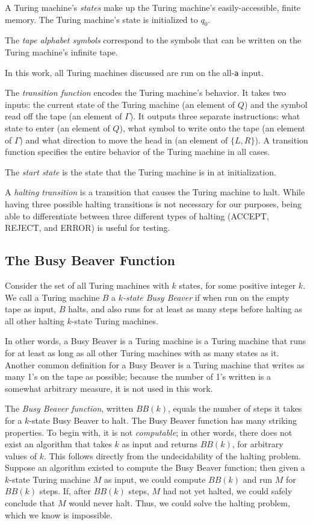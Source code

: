 \documentclass[11pt]{article}
\begin{document}
A Turing machine's \emph{states} make up the Turing machine's easily-accessible, finite memory. The Turing machine's state is initialized to $q_0$. 

The \emph{tape alphabet symbols} correspond to the symbols that can be written on the Turing machine's infinite tape. 

In this work, all Turing machines discussed are run on the all-\texttt{a} input. 

The \emph{transition function} encodes the Turing machine's behavior. It takes two inputs: the current state of the Turing machine (an element of $Q$) and the symbol read off the tape (an element of $\Gamma$). It outputs three separate instructions: what state to enter (an element of $Q$), what symbol to write onto the tape (an element of $\Gamma$) and what direction to move the head in (an element of $\{L, R\}$). A transition function specifies the entire behavior of the Turing machine in all cases. 

The \emph{start state} is the state that the Turing machine is in at initialization. 

A \emph{halting transition} is a transition that causes the Turing machine to halt. While having three possible halting transitions is not necessary for our purposes, being able to differentiate between three different types of halting (ACCEPT, REJECT, and ERROR) is useful for testing.

\subsection{The Busy Beaver Function}

Consider the set of all Turing machines with $k$ states, for some positive integer $k$. We call a Turing machine $B$ a $k$\emph{-state Busy Beaver} if when run on the empty tape as input, $B$ halts, and also runs for at least as many steps before halting as all other halting $k$-state Turing machines.~\cite{busybeaver} 

In other words, a Busy Beaver is a Turing machine is a Turing machine that runs for at least as long as all other Turing machines with as many states as it. Another common definition for a Busy Beaver is a Turing machine that writes as many 1's on the tape as possible; because the number of 1's written is a somewhat arbitrary measure, it is not used in this work. 

The \emph{Busy Beaver function}, written $BB(k)$, equals the number of steps it takes for a $k$-state Busy Beaver to halt. The Busy Beaver function has many striking properties. To begin with, it is not \emph{computable}; in other words, there does not exist an algorithm that takes $k$ as input and returns $BB(k)$, for arbitrary values of $k$. This follows directly from the undecidability of the halting problem. Suppose an algorithm existed to compute the Busy Beaver function; then given a $k$-state Turing machine $M$ as input, we could compute $BB(k)$ and run $M$ for $BB(k)$ steps. If, after $BB(k)$ steps, $M$ had not yet halted, we could safely conclude that $M$ would never halt. Thus, we could solve the halting problem, which we know is impossible. 
\end{document}
